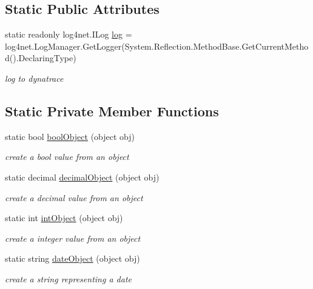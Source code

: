 \subsection*{Static Public Attributes}
\begin{DoxyCompactItemize}
\item 
static readonly log4net.\+I\+Log \mbox{\hyperlink{class_g_f_s_c_1_1_services_1_1_end_of_term_1_1_quotes_a92a57cf3cd2ba55b1af534b624502a66}{log}} = log4net.\+Log\+Manager.\+Get\+Logger(System.\+Reflection.\+Method\+Base.\+Get\+Current\+Method().Declaring\+Type)
\begin{DoxyCompactList}\small\item\em log to dynatrace \end{DoxyCompactList}\end{DoxyCompactItemize}
\subsection*{Static Private Member Functions}
\begin{DoxyCompactItemize}
\item 
static bool \mbox{\hyperlink{class_g_f_s_c_1_1_services_1_1_end_of_term_1_1_quotes_a0200e14327f035a94b974b20fec25bb9}{bool\+Object}} (object obj)
\begin{DoxyCompactList}\small\item\em create a bool value from an object \end{DoxyCompactList}\item 
static decimal \mbox{\hyperlink{class_g_f_s_c_1_1_services_1_1_end_of_term_1_1_quotes_aa084a18e05d797d859cb298954f0ae62}{decimal\+Object}} (object obj)
\begin{DoxyCompactList}\small\item\em create a decimal value from an object \end{DoxyCompactList}\item 
static int \mbox{\hyperlink{class_g_f_s_c_1_1_services_1_1_end_of_term_1_1_quotes_acbdb33811599f2d58d669799c3e7c794}{int\+Object}} (object obj)
\begin{DoxyCompactList}\small\item\em create a integer value from an object \end{DoxyCompactList}\item 
static string \mbox{\hyperlink{class_g_f_s_c_1_1_services_1_1_end_of_term_1_1_quotes_a7962fb9da488a4c449c5a832402ba20e}{date\+Object}} (object obj)
\begin{DoxyCompactList}\small\item\em create a string representing a date \end{DoxyCompactList}\end{DoxyCompactItemize}



